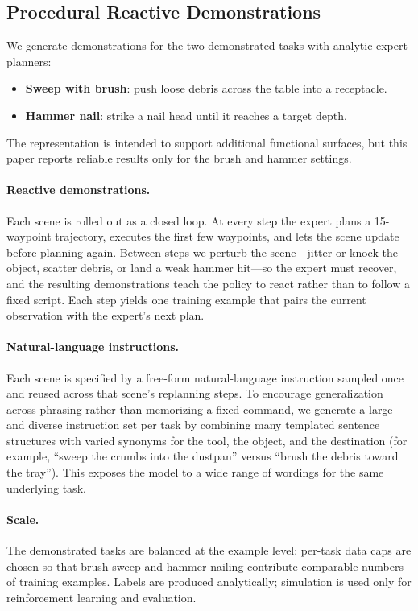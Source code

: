 \documentclass[11pt]{article}
\begin{document}
\subsection{Procedural Reactive Demonstrations}
\label{sec:data}

We generate demonstrations for the two demonstrated tasks with analytic expert planners:
\begin{itemize}
  \item \textbf{Sweep with brush}: push loose debris across the table into a receptacle.
  \item \textbf{Hammer nail}: strike a nail head until it reaches a target depth.
\end{itemize}
The representation is intended to support additional functional surfaces, but this paper reports reliable results only for the brush and hammer settings.

\paragraph{Reactive demonstrations.}
Each scene is rolled out as a closed loop.
At every step the expert plans a 15-waypoint trajectory, executes the first few waypoints, and lets the scene update before planning again.
Between steps we perturb the scene---jitter or knock the object, scatter debris, or land a weak hammer hit---so the expert must recover, and the resulting demonstrations teach the policy to react rather than to follow a fixed script.
Each step yields one training example that pairs the current observation with the expert's next plan.

\paragraph{Natural-language instructions.}
Each scene is specified by a free-form natural-language instruction sampled once and reused across that scene's replanning steps.
To encourage generalization across phrasing rather than memorizing a fixed command, we generate a large and diverse instruction set per task by combining many templated sentence structures with varied synonyms for the tool, the object, and the destination (for example, ``sweep the crumbs into the dustpan'' versus ``brush the debris toward the tray'').
This exposes the model to a wide range of wordings for the same underlying task.

\paragraph{Scale.}
The demonstrated tasks are balanced at the example level: per-task data caps are chosen so that brush sweep and hammer nailing contribute comparable numbers of training examples.
Labels are produced analytically; simulation is used only for reinforcement learning and evaluation.
\end{document}
